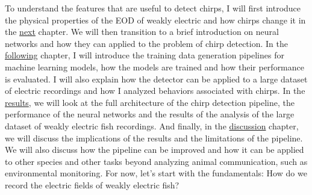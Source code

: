 To understand the features that are useful to detect chirps, I will first
introduce the physical properties of the \acrfull{EOD} of weakly electric and
how chirps change it in the \hyperref[chap:background]{next} chapter. We will
then transition to a brief introduction on neural networks and how they can
applied to the problem of chirp detection. In the
\hyperref[chap:methods]{following} chapter, I will introduce the training data
generation pipelines for machine learning models, how the models are trained
and how their performance is evaluated. I will also explain how the detector
can be applied to a large dataset of electric recordings and how I analyzed
behaviors associated with chirps. In the \hyperref[chap:results]{results}, we
will look at the full architecture of the chirp detection pipeline, the
performance of the neural networks and the results of the analysis of the large
dataset of weakly electric fish recordings. And finally, in the
\hyperref[chap:discussion]{discussion} chapter, we will discuss the
implications of the results and the limitations of the pipeline. We will also
discuss how the pipeline can be improved and how it can be applied to other
species and other tasks beyond analyzing animal communication, such as
environmental monitoring. For now, let's start with the fundamentals: How do we
record the electric fields of weakly electric fish?

